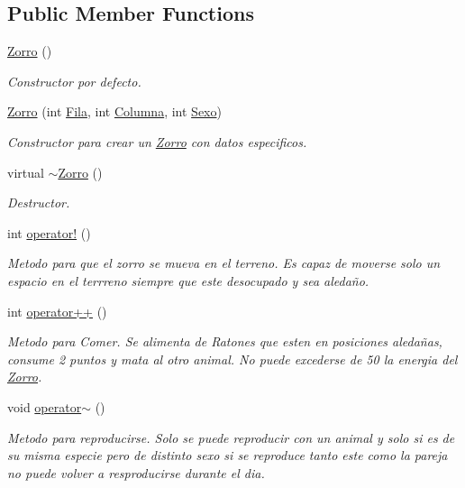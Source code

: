 \subsection*{Public Member Functions}
\begin{DoxyCompactItemize}
\item 
\hyperlink{classZorro_adb6072a36faa243b1c185ec3e566f556}{Zorro} ()
\begin{DoxyCompactList}\small\item\em Constructor por defecto. \end{DoxyCompactList}\item 
\hyperlink{classZorro_a16f7f378084d2fa795750d1ff824ca76}{Zorro} (int \hyperlink{classAnimal_ab403adfd13b57143eff123bdd6a2febb}{Fila}, int \hyperlink{classAnimal_a340d64e6e4ffe5f35e0855c63aad1bd3}{Columna}, int \hyperlink{classAnimal_a42b629ae5a7e0c05263a3f6e592ea116}{Sexo})
\begin{DoxyCompactList}\small\item\em Constructor para crear un \hyperlink{classZorro}{Zorro} con datos especificos. \end{DoxyCompactList}\item 
virtual \hyperlink{classZorro_a73fe75fd4746a9347da559ffaa741842}{$\sim$\+Zorro} ()
\begin{DoxyCompactList}\small\item\em Destructor. \end{DoxyCompactList}\item 
int \hyperlink{classZorro_ad9d441234c592f01f5be69415d904423}{operator!} ()
\begin{DoxyCompactList}\small\item\em Metodo para que el zorro se mueva en el terreno. Es capaz de moverse solo un espacio en el terrreno siempre que este desocupado y sea aledaño. \end{DoxyCompactList}\item 
int \hyperlink{classZorro_ac9a48ca08f8d7f6481be2cf0115cc209}{operator++} ()
\begin{DoxyCompactList}\small\item\em Metodo para Comer. Se alimenta de Ratones que esten en posiciones aledañas, consume 2 puntos y mata al otro animal. No puede excederse de 50 la energia del \hyperlink{classZorro}{Zorro}. \end{DoxyCompactList}\item 
void \hyperlink{classZorro_a9fdef26a109d506ac85b739c9920cc85}{operator$\sim$} ()
\begin{DoxyCompactList}\small\item\em Metodo para reproducirse. Solo se puede reproducir con un animal y solo si es de su misma especie pero de distinto sexo si se reproduce tanto este como la pareja no puede volver a resproducirse durante el dia. \end{DoxyCompactList}\end{DoxyCompactItemize}
